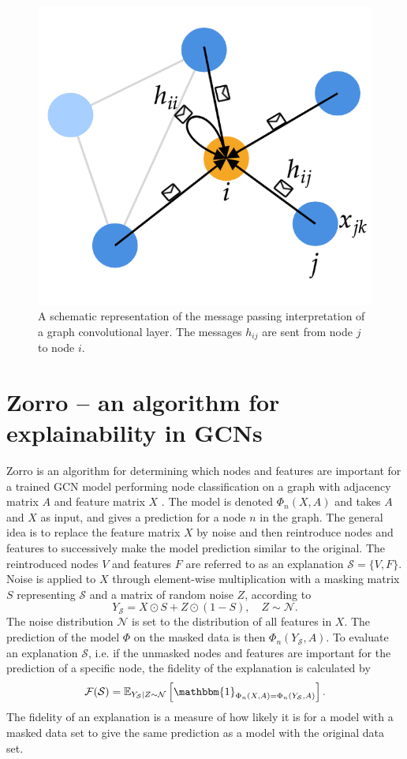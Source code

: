 \begin{figure}[H]
    \centering
    \includegraphics[width=0.5\linewidth]{chapters/images_theory/message_passing.png}
    \caption{A schematic representation of the message passing interpretation of a graph convolutional layer. The messages $h_{ij}$ are sent from node $j$ to node $i$.}
    \label{fig:message_passing}
\end{figure}




\section{Zorro -- an algorithm for explainability in GCNs}
\label{sec:zorro}

Zorro is an algorithm for determining which nodes and features are important for a trained GCN model performing node classification on a graph with adjacency matrix $A$ and feature matrix $X$ \cite{zorro}. The model is denoted $\Phi_n(X,A)$ and takes $A$ and $X$ as input, and gives a prediction for a node $n$ in the graph. The general idea is to replace the feature matrix $X$ by noise and then reintroduce nodes and features to successively make the model prediction similar to the original. The reintroduced nodes $V$ and features $F$ are referred to as an explanation $\mathcal{S} = \{V, F\}$. Noise is applied to $X$ through element-wise multiplication with a masking matrix $S$ representing $\mathcal{S}$ and a matrix of random noise $Z$, according to
\begin{equation}
    Y_\mathcal{S} = X \odot S + Z \odot (1- S), \quad Z \sim \mathcal{N}.
\end{equation}
The noise distribution $\mathcal{N}$ is set to the distribution of all features in $X$. The prediction of the model $\Phi$ on the masked data is then $\Phi_n(Y_{\mathcal{S}}, A)$. To evaluate an explanation $\mathcal{S}$, i.e. if the unmasked nodes and features are important for the prediction of a specific node, the fidelity of the explanation is calculated by
\begin{equation}
    \mathcal{F}(\mathcal{S}) = \mathbb{E}_{Y_{\mathcal{S}}|Z\sim\mathcal{N}}\left[\mathbbm{1}_{\Phi_n(X,A) = \Phi_n(Y_{\mathcal{S}},A)}\right].
    \label{eq:Ys}
\end{equation}
The fidelity of an explanation is a measure of how likely it is for a model with a masked data set to give the same prediction as a model with the original data set.

